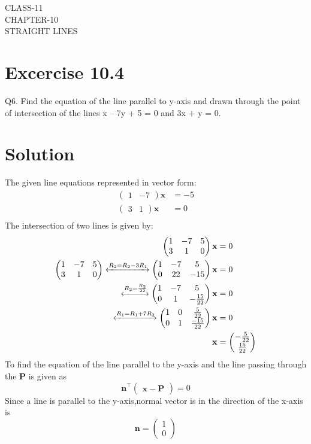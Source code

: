 \documentclass[12pt]{article}
\newcommand{\myvec}[1]{\ensuremath{\begin{pmatrix}#1\end{pmatrix}}}
\let\vec\mathbf
\begin{document}
\begin{center}
\textbf\large{CLASS-11 \\ CHAPTER-10 \\ STRAIGHT LINES}
\end{center}
\section*{Excercise 10.4}

Q6. Find the equation of the line parallel to y-axis and drawn through the point of
intersection of the lines x – 7y + 5 = 0 and 3x + y = 0.
\section*{Solution}
The given line equations represented in vector form:
\begin{align}
\myvec{1&-7}\vec{x}&=-5\\
\myvec{3&1}\vec{x}&=0\\
\end{align}
The intersection of two lines is given by:
\begin{align}
\myvec{
1&-7&5\\
3&1&0
} \vec{x}&=0\\
\myvec{
1&-7&5\\
3&1&0
}
\xleftrightarrow[]{R_2=R_2-3R_1}
\myvec{
1&-7&5\\
0&22&-15
}\vec{x}&=0\\\xleftrightarrow[]{R_2=\frac{R_2}{22}}
\myvec{
  1&-7&5\\[1pt]
0&1&-\frac{15}{22}
}\vec{x}&=0\\
\xleftrightarrow[]{R_1={R_1}+7{R_2}}
\myvec{
1&0&\frac{5}{22}\\[1pt]
0&1&\frac{-15}{22}
}\vec{x}&=0 \label{eq:7}\\
  \vec{x}&=\myvec{-\frac{5}{22}\\[1pt] \frac{15}{22}}\\
\end{align}
To find the equation of the line parallel to the y-axis and the line passing through the $\vec{P}$ is given as
\begin{equation}
    \vec{n}^{\top}\myvec{\vec{x}-\vec{P}}=0
    \label{eq:line}
\end{equation}
Since a line is parallel to the y-axis,normal vector is in the direction of the x-axis is
\begin{equation}
    \vec{n}=\myvec{1\\0}
    \label{eq:normal}
\end{equation}
\end{document}
